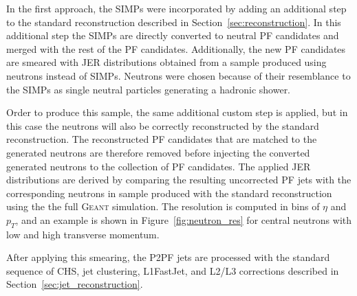 In the first approach, the \acp{SIMP} were incorporated by adding an additional step to the standard reconstruction described in Section~\ref{sec:reconstruction}. In this additional step the \acp{SIMP} are directly converted to neutral \ac{PF} candidates and merged with the rest of the \ac{PF} candidates. Additionally, the new \ac{PF} candidates are smeared with \ac{JER} distributions obtained from a sample produced using neutrons instead of \acp{SIMP}. Neutrons were chosen because of their resemblance to the \acp{SIMP} as single neutral particles generating a hadronic shower. 

Order to produce this sample, the same additional custom step is applied, but in this case the neutrons will also be correctly reconstructed by the standard reconstruction. The reconstructed \ac{PF} candidates that are matched to the generated neutrons are therefore removed before injecting the converted generated neutrons to the collection of \ac{PF} candidates. The applied \ac{JER} distributions are derived by comparing the resulting uncorrected \ac{PF} jets with the corresponding neutrons in sample produced with the standard reconstruction using the the full \textsc{Geant} simulation. The resolution is computed in bins of $\eta$ and $p_T$, and an example is shown in Figure~\ref{fig:neutron_res} for central neutrons with low and high transverse momentum. 

After applying this smearing, the P2PF jets are processed with the standard sequence of \ac{CHS}, jet clustering, L1FastJet, and L2/L3 corrections described in Section~\ref{sec:jet_reconstruction}.



